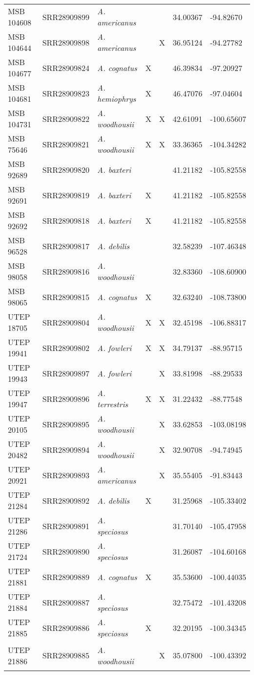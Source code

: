 \begin{longtable}{ lllllll }
MSB 104608 & SRR28909899 & \textit{A. americanus} &  &  & 34.00367 & -94.82670 \\ 
MSB 104644 & SRR28909898 & \textit{A. americanus} &  & X & 36.95124 & -94.27782 \\ 
MSB 104677 & SRR28909824 & \textit{A. cognatus} & X &  & 46.39834 & -97.20927 \\ 
MSB 104681 & SRR28909823 & \textit{A. hemiophrys} & X &  & 46.47076 & -97.04604 \\ 
MSB 104731 & SRR28909822 & \textit{A. woodhousii} & X & X & 42.61091 & -100.65607 \\ 
MSB 75646 & SRR28909821 & \textit{A. woodhousii} & X & X & 33.36365 & -104.34282 \\ 
MSB 92689 & SRR28909820 & \textit{A. baxteri} &  &  & 41.21182 & -105.82558 \\ 
MSB 92691 & SRR28909819 & \textit{A. baxteri} & X &  & 41.21182 & -105.82558 \\ 
MSB 92692 & SRR28909818 & \textit{A. baxteri} & X &  & 41.21182 & -105.82558 \\ 
MSB 96528 & SRR28909817 & \textit{A. debilis} &  &  & 32.58239 & -107.46348 \\ 
MSB 98058 & SRR28909816 & \textit{A. woodhousii} &  &  & 32.83360 & -108.60900 \\ 
MSB 98065 & SRR28909815 & \textit{A. cognatus} & X &  & 32.63240 & -108.73800 \\ 
UTEP 18705 & SRR28909804 & \textit{A. woodhousii} & X & X & 32.45198 & -106.88317 \\ 
UTEP 19941 & SRR28909802 & \textit{A. fowleri} & X & X & 34.79137 & -88.95715 \\ 
UTEP 19943 & SRR28909897 & \textit{A. fowleri} &  & X & 33.81998 & -88.29533 \\ 
UTEP 19947 & SRR28909896 & \textit{A. terrestris} & X & X & 31.22432 & -88.77548 \\ 
UTEP 20105 & SRR28909895 & \textit{A. woodhousii} &  & X & 33.62853 & -103.08198 \\ 
UTEP 20482 & SRR28909894 & \textit{A. woodhousii} &  & X & 32.90708 & -94.74945 \\ 
UTEP 20921 & SRR28909893 & \textit{A. americanus} &  & X & 35.55405 & -91.83443 \\ 
UTEP 21284 & SRR28909892 & \textit{A. debilis} & X &  & 31.25968 & -105.33402 \\ 
UTEP 21286 & SRR28909891 & \textit{A. speciosus} &  &  & 31.70140 & -105.47958 \\ 
UTEP 21724 & SRR28909890 & \textit{A. speciosus} &  &  & 31.26087 & -104.60168 \\ 
UTEP 21881 & SRR28909889 & \textit{A. cognatus} & X &  & 35.53600 & -100.44035 \\ 
UTEP 21884 & SRR28909887 & \textit{A. speciosus} &  &  & 32.75472 & -101.43208 \\ 
UTEP 21885 & SRR28909886 & \textit{A. speciosus} & X &  & 32.20195 & -100.34345 \\ 
UTEP 21886 & SRR28909885 & \textit{A. woodhousii} &  & X & 35.07800 & -100.43392

\label{table:loanedPhylo}
\end{longtable}